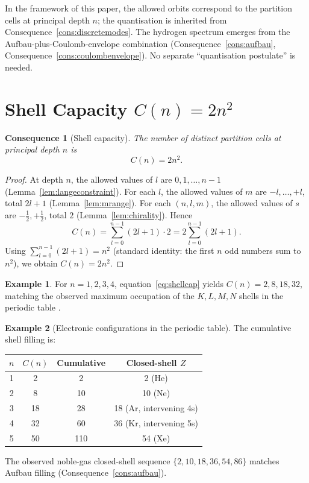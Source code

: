 \documentclass[11pt,twocolumn,a4paper]{article}
\theoremstyle{axiomstyle}
\theoremstyle{conseqstyle}
\newtheorem{consequence}{Consequence}
\theoremstyle{definition}
\newtheorem{example}{Example}
\theoremstyle{remark}
\begin{document}
In the framework of this paper, the allowed orbits correspond to the partition cells at principal depth $n$; the quantisation is inherited from Consequence~\ref{cons:discretemodes}. The hydrogen spectrum emerges from the Aufbau-plus-Coulomb-envelope combination (Consequence~\ref{cons:aufbau}, Consequence~\ref{cons:coulombenvelope}). No separate ``quantisation postulate'' is needed.

\section{Shell Capacity $C(n)=2n^{2}$}
\label{sec:shellcapacity}

\begin{consequence}[Shell capacity]
\label{cons:shellcapacity}
The number of distinct partition cells at principal depth $n$ is
\begin{equation}
C(n)=2n^{2}.
\label{eq:shellcap}
\end{equation}
\end{consequence}

\begin{proof}
At depth $n$, the allowed values of $l$ are $0,1,\ldots,n-1$ (Lemma~\ref{lem:langeconstraint}). For each $l$, the allowed values of $m$ are $-l,\ldots,+l$, total $2l+1$ (Lemma~\ref{lem:mrange}). For each $(n,l,m)$, the allowed values of $s$ are $-\tfrac12,+\tfrac12$, total $2$ (Lemma~\ref{lem:chirality}). Hence
\begin{equation*}
C(n)=\sum_{l=0}^{n-1}(2l+1)\cdot 2=2\sum_{l=0}^{n-1}(2l+1).
\end{equation*}
Using $\sum_{l=0}^{n-1}(2l+1)=n^{2}$ (standard identity: the first $n$ odd numbers sum to $n^{2}$), we obtain $C(n)=2n^{2}$.
\end{proof}

\begin{example}
For $n=1,2,3,4$, equation~\eqref{eq:shellcap} yields $C(n)=2,8,18,32$, matching the observed maximum occupation of the $K,L,M,N$ shells in the periodic table \citep{herzberg1944}.
\end{example}

\begin{example}[Electronic configurations in the periodic table]
The cumulative shell filling is:
\begin{center}
\begin{tabular}{c|c|c|c}
\toprule
$n$ & $C(n)$ & Cumulative & Closed-shell $Z$ \\
\midrule
1 & 2  & 2  & 2 (He) \\
2 & 8  & 10 & 10 (Ne) \\
3 & 18 & 28 & 18 (Ar, intervening 4s) \\
4 & 32 & 60 & 36 (Kr, intervening 5s) \\
5 & 50 & 110 & 54 (Xe) \\
\bottomrule
\end{tabular}
\end{center}
The observed noble-gas closed-shell sequence $\{2,10,18,36,54,86\}$ matches Aufbau filling (Consequence~\ref{cons:aufbau}).
\end{example}
\end{document}
